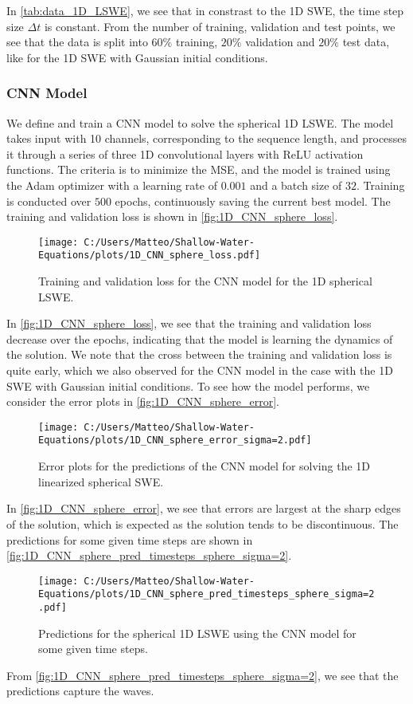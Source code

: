 In \autoref{tab:data_1D_LSWE}, we see that in constrast to the 1D SWE, the time step size $\Delta t$ is constant.
From the number of training, validation and test points, we see that the data is split into $60\%$ training, $20\%$ validation and $20\%$ test data, like for the 1D SWE with Gaussian initial conditions.

\subsubsection*{CNN Model}
We define and train a CNN model to solve the spherical 1D LSWE.
The model takes input with 10 channels, corresponding to the sequence length, and processes it through a series of three 1D convolutional layers with ReLU activation functions.
The criteria is to minimize the MSE, and the model is trained using the Adam optimizer with a learning rate of $0.001$ and a batch size of $32$.
Training is conducted over $500$ epochs, continuously saving the current best model.
The training and validation loss is shown in \autoref{fig:1D_CNN_sphere_loss}.
\begin{figure}[H]
    \centering
    \texttt{[image: C:/Users/Matteo/Shallow-Water-Equations/plots/1D\_CNN\_sphere\_loss.pdf]}
    \caption{Training and validation loss for the CNN model for the 1D spherical LSWE.}\label{fig:1D_CNN_sphere_loss}
\end{figure}
In \autoref{fig:1D_CNN_sphere_loss}, we see that the training and validation loss decrease over the epochs, indicating that the model is learning the dynamics of the solution.
We note that the cross between the training and validation loss is quite early, which we also observed for the CNN model in the case with the 1D SWE with Gaussian initial conditions.
To see how the model performs, we consider the error plots in \autoref{fig:1D_CNN_sphere_error}.
\begin{figure}[H]
    \centering
    \texttt{[image: C:/Users/Matteo/Shallow-Water-Equations/plots/1D\_CNN\_sphere\_error\_sigma=2.pdf]}
    \caption{Error plots for the predictions of the CNN model for solving the 1D linearized spherical SWE.}\label{fig:1D_CNN_sphere_error}
\end{figure}
In \autoref{fig:1D_CNN_sphere_error}, we see that errors are largest at the sharp edges of the solution, which is expected as the solution tends to be discontinuous.
The predictions for some given time steps are shown in \autoref{fig:1D_CNN_sphere_pred_timesteps_sphere_sigma=2}.
\begin{figure}[H]
    \centering
    \texttt{[image: C:/Users/Matteo/Shallow-Water-Equations/plots/1D\_CNN\_sphere\_pred\_timesteps\_sphere\_sigma=2.pdf]}
    \caption{Predictions for the spherical 1D LSWE using the CNN model for some given time steps.}\label{fig:1D_CNN_sphere_pred_timesteps_sphere_sigma=2}
\end{figure}
From \autoref{fig:1D_CNN_sphere_pred_timesteps_sphere_sigma=2}, we see that the predictions capture the waves.%

